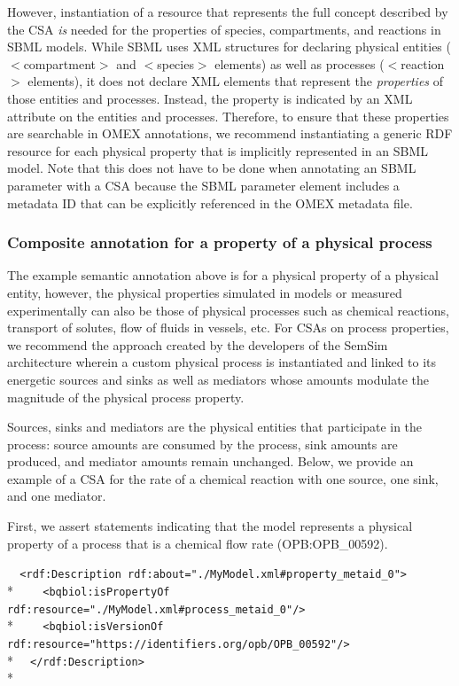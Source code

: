 \documentclass[pdftex,rgb,dvipsnames,svgnames,hyperref,table]{report}
\begin{document}
However, instantiation of a resource that represents the full concept described by the CSA \textit{is} needed for the properties of species, compartments, and reactions in SBML models. While SBML uses XML structures for declaring physical entities ($<$compartment$>$ and $<$species$>$ elements) as well as processes ($<$reaction$>$ elements), it does not declare XML elements that represent the \textit{properties} of those entities and processes. Instead, the property is indicated by an XML attribute on the entities and processes. Therefore, to ensure that these properties are searchable in OMEX annotations, we recommend instantiating a generic RDF resource for each physical property that is implicitly represented in an SBML model. Note that this does not have to be done when annotating an SBML parameter with a CSA because the SBML parameter element includes a metadata ID that can be explicitly referenced in the OMEX metadata file.

\subsubsection{Composite annotation for a property of a physical process}

The example semantic annotation above is for a physical property of a physical entity, however, the physical properties simulated in models or measured experimentally can also be those of physical processes such as chemical reactions, transport of solutes, flow of fluids in vessels, etc. For CSAs on process properties, we recommend the approach created by the developers of the SemSim architecture wherein a custom physical process is instantiated and linked to its energetic sources and sinks as well as mediators whose amounts modulate the magnitude of the physical process property. 

Sources, sinks and mediators are the physical entities that participate in the process: source amounts are consumed by the process, sink amounts are produced, and mediator amounts remain unchanged. Below, we provide  an example of a CSA for the rate of a chemical reaction with one source, one sink, and one mediator. 

First, we assert statements indicating that the model represents a physical property of a process that is a chemical flow rate (OPB:OPB\_00592).

  \verb|  <rdf:Description rdf:about="./MyModel.xml#property_metaid_0">|\\*
  \verb|    <bqbiol:isPropertyOf rdf:resource="./MyModel.xml#process_metaid_0"/>|\\*
  \verb|    <bqbiol:isVersionOf rdf:resource="https://identifiers.org/opb/OPB_00592"/>|\\*
  \verb|  </rdf:Description>|\\*
\end{document}
